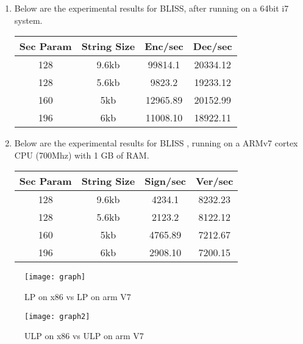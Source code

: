 \documentclass[conference]{IEEEtran}
\begin{document}
\begin{enumerate}
\begin{enumerate}

\item{Below are the experimental results for BLISS, after running on a 64bit i7 system.}

\begin{center}
\small
\begin{tabular}{||c c c c||} 
\hline
Sec Param & String Size & Enc/sec & Dec/sec \\ [0.4ex] 
\hline\hline
128 & 9.6kb & 99814.1  & 20334.12\\ 
\hline
128 & 5.6kb & 9823.2 &  19233.12 \\
\hline
160 & 5kb & 12965.89 &  20152.99\\
\hline
196 & 6kb & 11008.10 &  18922.11  \\
\hline
\end{tabular}
\end{center}

\item{Below are the experimental results for BLISS , running on a ARMv7 cortex CPU (700Mhz) with 1 GB of RAM.}

\begin{center}
\small
\begin{tabular}{||c c c c||} 
\hline
Sec Param & String Size & Sign/sec & Ver/sec \\ [0.4ex] 
\hline\hline
128 & 9.6kb & 4234.1  & 8232.23\\ 
\hline
128 & 5.6kb & 2123.2 & 8122.12 \\
\hline
160 & 5kb & 4765.89 & 7212.67\\
\hline
196 & 6kb &  2908.10 & 7200.15  \\
\hline
\end{tabular}
\end{center}

\end{enumerate}

\end{enumerate}

\begin{figure}[htp]
\centering
\texttt{[image: graph]}
\caption{LP on x86 vs LP on arm V7 }
\label{fig:graph}
\end{figure}

\begin{figure}[htp]
\centering
\texttt{[image: graph2]}
\caption{ULP on x86 vs ULP on arm V7 }
\label{fig:graph2}
\end{figure}
\end{document}
